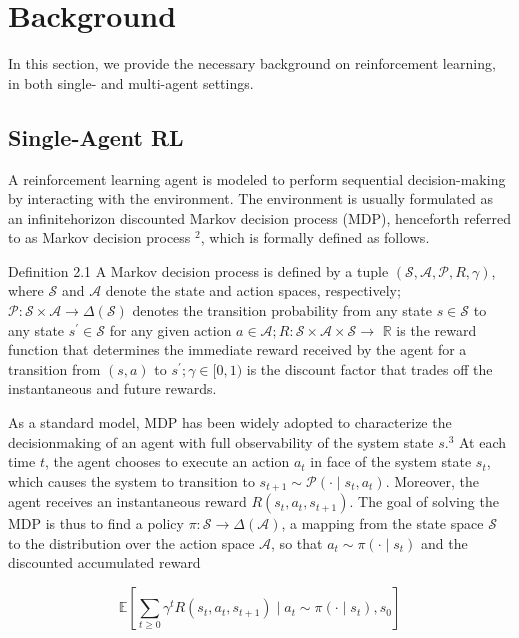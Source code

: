 \documentclass[10pt]{article}
\begin{document}
\section{Background}
In this section, we provide the necessary background on reinforcement learning, in both single- and multi-agent settings.

\subsection{Single-Agent RL}
A reinforcement learning agent is modeled to perform sequential decision-making by interacting with the environment. The environment is usually formulated as an infinitehorizon discounted Markov decision process (MDP), henceforth referred to as Markov decision process ${ }^{2}$, which is formally defined as follows.

Definition 2.1 A Markov decision process is defined by a tuple $(\mathcal{S}, \mathcal{A}, \mathcal{P}, R, \gamma)$, where $\mathcal{S}$ and $\mathcal{A}$ denote the state and action spaces, respectively; $\mathcal{P}: \mathcal{S} \times \mathcal{A} \rightarrow \Delta(\mathcal{S})$ denotes the transition probability from any state $s \in \mathcal{S}$ to any state $s^{\prime} \in \mathcal{S}$ for any given action $a \in \mathcal{A} ; R: \mathcal{S} \times \mathcal{A} \times \mathcal{S} \rightarrow$ $\mathbb{R}$ is the reward function that determines the immediate reward received by the agent for a transition from $(s, a)$ to $s^{\prime} ; \gamma \in[0,1)$ is the discount factor that trades off the instantaneous and future rewards.

As a standard model, MDP has been widely adopted to characterize the decisionmaking of an agent with full observability of the system state $s .{ }^{3}$ At each time $t$, the agent chooses to execute an action $a_{t}$ in face of the system state $s_{t}$, which causes the system to transition to $s_{t+1} \sim \mathcal{P}\left(\cdot \mid s_{t}, a_{t}\right)$. Moreover, the agent receives an instantaneous reward $R\left(s_{t}, a_{t}, s_{t+1}\right)$. The goal of solving the MDP is thus to find a policy $\pi: \mathcal{S} \rightarrow \Delta(\mathcal{A})$, a mapping from the state space $\mathcal{S}$ to the distribution over the action space $\mathcal{A}$, so that $a_{t} \sim \pi\left(\cdot \mid s_{t}\right)$ and the discounted accumulated reward

\[
\mathbb{E}\left[\sum_{t \geq 0} \gamma^{t} R\left(s_{t}, a_{t}, s_{t+1}\right) \mid a_{t} \sim \pi\left(\cdot \mid s_{t}\right), s_{0}\right]
\]
\end{document}
